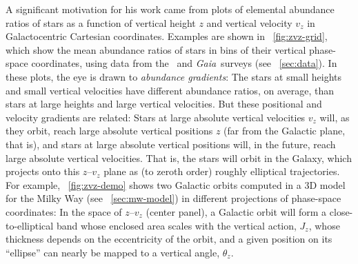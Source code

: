 \documentclass[modern]{aastex63}
\newcommand{\gaia}{\textsl{Gaia}}
\newcommand{\apogee}{\acronym{APOGEE}}
\begin{document}
A significant motivation for his work came from plots of elemental abundance
ratios of stars as a function of vertical height $z$ and vertical velocity $v_z$
in Galactocentric Cartesian coordinates.
Examples are shown in \figurename~\ref{fig:zvz-grid}, which show the mean
abundance ratios of stars in bins of their vertical phase-space coordinates,
using data from the \apogee\ and \gaia\ surveys (see
\sectionname~\ref{sec:data}).
In these plots, the eye is drawn to \emph{abundance gradients}:
The stars at small heights and small vertical velocities have different
abundance ratios, on average, than stars at large heights and large vertical
velocities.
But these positional and velocity gradients are related:
Stars at large absolute vertical velocities $v_z$ will, as they orbit, reach
large absolute vertical positions $z$ (far from the Galactic plane, that is),
and stars at large absolute vertical positions will, in the future, reach large
absolute vertical velocities.
That is, the stars will orbit in the Galaxy, which projects onto this $z$--$v_z$
plane as (to zeroth order) roughly elliptical trajectories.
For example, \figurename~\ref{fig:zvz-demo} shows two Galactic orbits computed
in a 3D model for the Milky Way (see \sectionname~\ref{sec:mw-model}) in
different projections of phase-space coordinates:
In the space of $z$--$v_z$ (center panel), a Galactic orbit will form a
close-to-elliptical band whose enclosed area scales with the vertical action,
$J_z$, whose thickness depends on the eccentricity of the orbit, and a given
position on its ``ellipse'' can nearly be mapped to a vertical angle,
$\theta_z$.
\end{document}
